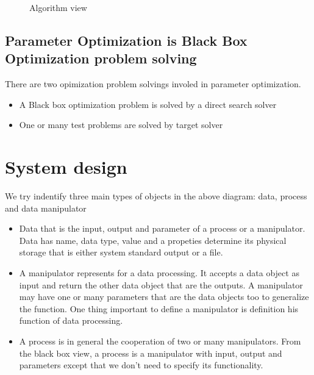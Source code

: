 \documentclass{report}
\begin{document}
\begin{figure}[hpbt]
  \caption{Algorithm view}
  \label{fig:algorithm-view}
\end{figure}

\section{Parameter Optimization is Black Box Optimization problem solving}
\par There are two opimization problem solvings involed in parameter optimization.
\begin{itemize}
\item A Black box optimization problem is solved by a direct search solver
\item One or many test problems are solved by target solver 
\end{itemize}
\chapter{System design}
\par We try indentify three main types of objects in the above diagram: data, process and data manipulator
\begin{itemize}
\item Data that is the input, output and parameter of a process or a manipulator. Data has name, data type, 
  value and a propeties determine its physical storage that is either system standard output or a file. 
\item A manipulator represents for a data processing. It accepts a data object as input and return the other 
  data object that are the outputs. A manipulator may have one or many parameters that are the data objects 
  too to generalize the function. One thing important to define a manipulator is definition his function of 
  data processing.
\item A process is in general the cooperation of two or many manipulators. From the black box view, a process
  is a manipulator with input, output and parameters except that we don't need to specify its functionality.
\end{itemize}
\end{document}
